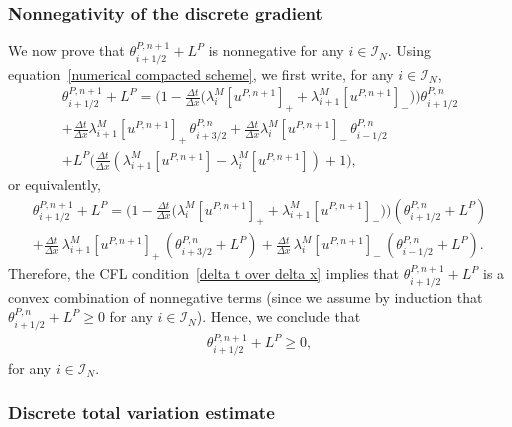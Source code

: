 \documentclass[11pt]{amsart}
\newcommand{\I}{\mathcal{I}_N}
\begin{document}
\subsubsection{Nonnegativity of the discrete gradient} We now prove that $\theta_{i + 1/2}^{P, n + 1} + L^P$ is nonnegative for any $i\in\I$. Using equation~\eqref{numerical compacted scheme}, we first write, for any $i \in \I$,
\begin{multline*}
\theta_{i +1/2}^{P, n + 1} + L^P= \bigg(1 - \frac{\Delta t}{\Delta x} \big( \lambda^M_i[u^{P, n + 1}]_+ +  \lambda^M_{i + 1} [u^{P, n + 1}]_-\big) \bigg) \theta_{i + 1/2}^{P, n } \\
+ \frac{\Delta t}{\Delta x} \lambda^M_{i + 1}[u^{P, n + 1}]_+ \,\theta_{i +3/2}^{P, n } + \frac{\Delta t}{\Delta x}  \lambda^M_i [u^{P, n + 1}]_- \, \theta_{i -1/2}^{P, n } \\ + L^P \bigg(\frac{\Delta t}{\Delta x}( \lambda^M_{i + 1} [u^{P, n + 1}] -  \lambda^M_i [u^{P, n + 1}]) + 1\bigg),
\end{multline*}
or equivalently,
\begin{multline}\label{theta_convexcombin}
\theta_{i +1/2}^{P, n + 1} + L^P=\bigg(1 - \frac{\Delta t}{\Delta x} \big( \lambda^M_i[u^{P, n + 1}]_+ + \lambda^M_{i + 1} [u^{P, n +1}]_-\big) \bigg) \left(\theta_{i +1/2}^{P, n } + L^P\right) \\
+ \frac{\Delta t}{\Delta x} \, \lambda^M_{i + 1} [u^{P, n + 1}]_+ \, \left(\theta_{i +3/2}^{P, n } + L^P\right) +\frac{\Delta t}{\Delta x} \,  \lambda^M_i[u^{P, n + 1}]_- \, \left(\theta_{i -1/2}^{P, n } + L^P\right).
\end{multline}
Therefore, the CFL condition~\eqref{delta t over delta x} implies that $\theta^{P,n+1}_{i+1/2}+L^P$ is a convex combination of nonnegative terms (since we assume by induction that $\theta^{P,n}_{i+1/2}+L^P \geq 0$ for any $i\in\I$). Hence, we conclude that
\begin{align*}
    \theta^{P,n+1}_{i+1/2}+L^P \geq 0,
\end{align*}
for any $i \in \I$.

\subsubsection{Discrete total variation estimate}
\end{document}
